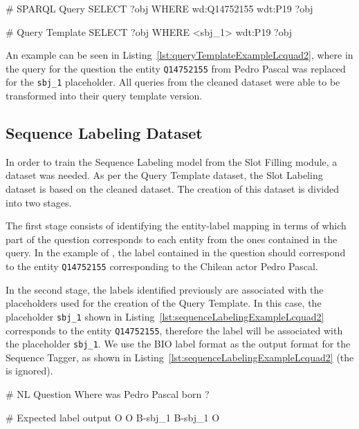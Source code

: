 \begin{sparqlcode}[%
    caption={\SPARQL{} query and its Query Template version.}, 
    label={lst:queryTemplateExampleLcquad2}]
# SPARQL Query
SELECT ?obj WHERE { wd:Q14752155 wdt:P19 ?obj }

# Query Template
SELECT ?obj WHERE { <sbj_1> wdt:P19 ?obj }
\end{sparqlcode}

An example can be seen in Listing~\ref{lst:queryTemplateExampleLcquad2}, where in the \SPARQL{} 
query for the question  the entity \texttt{Q14752155} 
from Pedro Pascal was replaced for the \texttt{sbj\_1} placeholder. All queries from the cleaned dataset 
were able to be transformed into their query template version.

\subsection{Sequence Labeling Dataset}
\label{cap4:experimentalDesign/QaDataset/queryTemplate}
In order to train the Sequence Labeling model from the Slot Filling module, a dataset was 
needed. As per the Query Template dataset, the Slot Labeling dataset is based on the cleaned 
\LCQuADtwo{} dataset. The creation of this dataset is divided into two stages. 

The first stage consists of identifying the entity-label mapping in terms of which part of the 
question corresponds to each entity from the ones contained in the \SPARQL{} query. In the example 
of , the label  contained in the 
question should correspond to the entity \texttt{Q14752155} corresponding to the Chilean actor Pedro 
Pascal. 

In the second stage, the labels identified previously are associated with the placeholders used 
for the creation of the Query Template. In this case, the placeholder \texttt{sbj\_1} shown in 
Listing~\ref{lst:sequenceLabelingExampleLcquad2} corresponds to the entity \texttt{Q14752155}, 
therefore the label  will be associated with the placeholder \texttt{sbj\_1}. 
We use the BIO label format as the output format for the Sequence Tagger, as shown in 
Listing~\ref{lst:sequenceLabelingExampleLcquad2} (the  is ignored).

\begin{sparqlcode}[%
    caption={BIO label representation for a Natural Language Question.}, 
    label={lst:sequenceLabelingExampleLcquad2}]
# NL Question
Where was Pedro Pascal born ?

# Expected label output
O O B-sbj_1 B-sbj_1 O
\end{sparqlcode}

